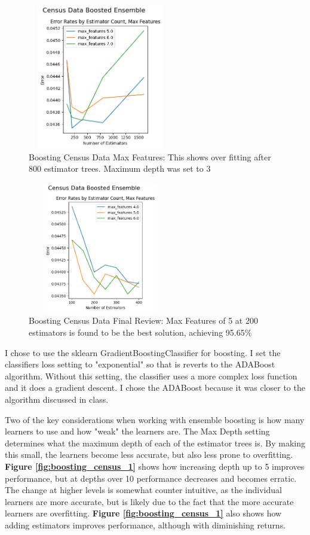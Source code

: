 \documentclass[letterpaper]{article} %
\begin{document}
\begin{figure}[h]
\centering
\includegraphics[width=2.5in, height=2.5in]{figures/Census_Data_Boosting_Estimator_Count_by_Max_Depth_boosting_3.png}
\caption{Boosting Census Data Max Features:  This shows over fitting after 800 estimator trees.  Maximum depth was set to 3  }
\label{fig:boosting_census_3}
\end{figure}

\begin{figure}[h]
\centering
\includegraphics[width=2.5in, height=2.25in]{figures/Census_Data_Boosting_Estimator_Count_by_Max_Depth_boosting_4.png}
\caption{Boosting Census Data Final Review:  Max Features of 5 at 200 estimators is found to be the best solution, achieving  95.65\% }
\label{fig:boosting_census_4}
\end{figure}

I chose to use the sklearn GradientBoostingClassifier for boosting.  I set the classifiers loss setting to "exponential" so that is reverts to the ADABoost algorithm. Without this setting, the classifier uses a more complex loss function and it does a gradient descent.  I chose the ADABoost because it was closer to the algorithm discussed in class.

Two of the key considerations when working with ensemble boosting is how many learners to use and how "weak" the learners are.  The Max Depth setting determines what the maximum depth of each of the estimator trees is.  By making this small, the learners become less accurate, but also less prone to overfitting. \textbf{Figure \ref{fig:boosting_census_1}} shows how increasing depth up to 5 improves performance, but at depths over 10 performance decreases and becomes erratic.  The change at higher levels is somewhat counter intuitive, as the individual learners are more accurate, but is likely due to the fact that the more accurate learners are overfitting.  \textbf{Figure \ref{fig:boosting_census_1}} also shows how adding estimators improves performance, although with diminishing returns.  
\end{document}
